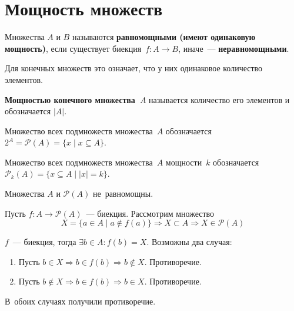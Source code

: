 \section{Мощность множеств}
Множества $A$ и $B$ называются \textbf{равномощными (имеют одинаковую мощность)}, если существует биекция~$f \colon A \to B$, иначе~--- \textbf{неравномощными}.

Для конечных множеств это означает, что у них одинаковое количество элементов.

 \textbf{Мощностью конечного множества~$A$} называется количество его элементов и обозначается $|A|$.

Множество всех подмножеств множества~$A$ обозначается $2^A = \mathcal P(A) = \{ x \mid x \subseteq A \}$.

Множество всех подмножеств множества~$A$ мощности~$k$ обозначается $\mathcal P_k(A) = \{ x \subseteq A \mid |x| = k \}$.

\begin{theorem}[Кантора]
Множества $A$ и $\mathcal P(A)$ не~равномощны.
\end{theorem}
\begin{proofcontra}
Пусть $f \colon A \to \mathcal P(A)$~--- биекция. Рассмотрим множество
\begin{equation*}
X = \{ a \in A \mid a \notin f(a) \} \Rightarrow X \subset A \Rightarrow X \in \mathcal P(A)
\end{equation*}

$f$~--- биекция, тогда $\exists b \in A \colon f(b) = X$.
Возможны два случая:
\begin{enumerate}
	\item Пусть $b \in X \Rightarrow b \in f(b) \Rightarrow b \notin X$.
	Противоречие.
	\item Пусть $b \notin X \Rightarrow b \in f(b) \Rightarrow b \in X$.
	Противоречие.
\end{enumerate}

В~обоих случаях получили противоречие.
\end{proofcontra}

